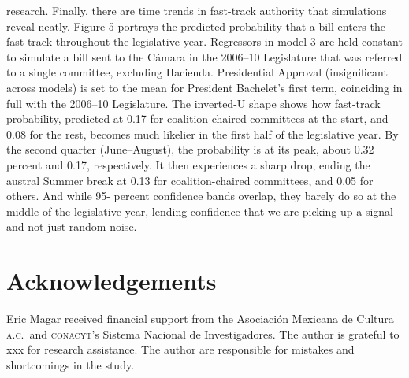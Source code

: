 \documentclass[letter,12pt]{article}
\begin{document}
research.
Finally, there are time trends in fast-track authority that simulations reveal neatly. Figure 5
portrays the predicted probability that a bill enters the fast-track throughout the legislative year.
Regressors in model 3 are held constant to simulate a bill sent to the Cámara in the 2006–10
Legislature that was referred to a single committee, excluding Hacienda. Presidential Approval
(insignificant across models) is set to the mean for President Bachelet’s first term, coinciding in full
with the 2006–10 Legislature. The inverted-U shape shows how fast-track probability, predicted
at 0.17 for coalition-chaired committees at the start, and 0.08 for the rest, becomes much likelier
in the first half of the legislative year. By the second quarter (June–August), the probability is at
its peak, about 0.32 percent and 0.17, respectively. It then experiences a sharp drop, ending the
austral Summer break at 0.13 for coalition-chaired committees, and 0.05 for others. And while 95-
percent confidence bands overlap, they barely do so at the middle of the legislative year, lending
confidence that we are picking up a signal and not just random noise.


\section*{Acknowledgements}
Eric Magar received financial support from the Asociaci\'on Mexicana de Cultura \textsc{a.c.}\ and \textsc{conacyt}'s Sistema Nacional de Investigadores. The author is grateful to xxx for research assistance.  The author are responsible for mistakes and shortcomings in the study.

\listofendnotes








\end{document}
